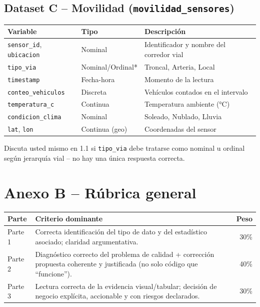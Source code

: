 \documentclass[11pt]{article}
\begin{document}
\subsection*{Dataset C -- Movilidad (\texttt{movilidad\_sensores})}
\begin{longtable}{p{3.2cm}p{3cm}p{7cm}}
\toprule
Variable & Tipo & Descripción \\
\midrule
\texttt{sensor\_id}, \texttt{ubicacion} & Nominal & Identificador y nombre del corredor vial \\
\texttt{tipo\_via} & Nominal/Ordinal* & Troncal, Arteria, Local \\
\texttt{timestamp} & Fecha-hora & Momento de la lectura \\
\texttt{conteo\_vehiculos} & Discreta & Vehículos contados en el intervalo \\
\texttt{temperatura\_c} & Continua & Temperatura ambiente (°C) \\
\texttt{condicion\_clima} & Nominal & Soleado, Nublado, Lluvia \\
\texttt{lat}, \texttt{lon} & Continua (geo) & Coordenadas del sensor \\
\bottomrule
\end{longtable}
{\footnotesize *Discuta usted mismo en 1.1 si \texttt{tipo\_via} debe tratarse como nominal u ordinal según jerarquía vial -- no hay una única respuesta correcta.}

\section*{Anexo B -- Rúbrica general}
\begin{longtable}{p{2.5cm}p{9cm}r}
\toprule
Parte & Criterio dominante & Peso \\
\midrule
Parte 1 & Correcta identificación del tipo de dato y del estadístico asociado; claridad argumentativa. & 30\% \\
Parte 2 & Diagnóstico correcto del problema de calidad + corrección propuesta coherente y justificada (no solo código que ``funcione''). & 40\% \\
Parte 3 & Lectura correcta de la evidencia visual/tabular; decisión de negocio explícita, accionable y con riesgos declarados. & 30\% \\
\bottomrule
\end{longtable}
\end{document}
